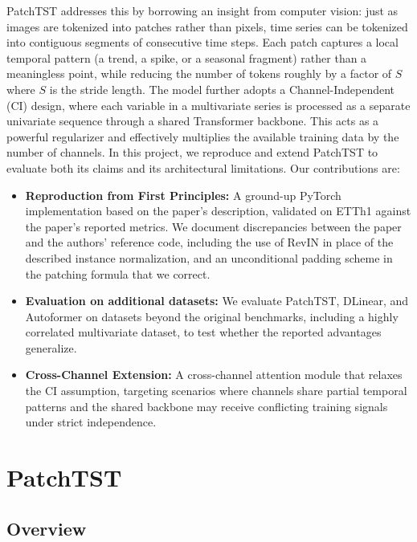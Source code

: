 \documentclass[11pt]{article}
\begin{document}
PatchTST addresses this by borrowing an insight from computer vision: just as images are tokenized into patches rather than pixels, time series can be tokenized into contiguous segments of consecutive time steps. Each patch captures a local temporal pattern (a trend, a spike, or a seasonal fragment) rather than a meaningless point, while reducing the number of tokens roughly by a factor of $S$ where $S$ is the stride length. The model further adopts a Channel-Independent (CI) design, where each variable in a multivariate series is processed as a separate univariate sequence through a shared Transformer backbone. This acts as a powerful regularizer and effectively multiplies the available training data by the number of channels.
In this project, we reproduce and extend PatchTST to evaluate both its claims and its architectural limitations. Our contributions are:
\begin{itemize}
\item \textbf{Reproduction from First Principles:} A ground-up PyTorch implementation based on the paper's description, validated on ETTh1 against the paper's reported metrics. We document discrepancies between the paper and the authors' reference code, including the use of RevIN in place of the described instance normalization, and an unconditional padding scheme in the patching formula that we correct.
\item \textbf{Evaluation on additional datasets:} We evaluate PatchTST, DLinear, and Autoformer on datasets beyond the original benchmarks, including a highly correlated multivariate dataset, to test whether the reported advantages generalize.
\item \textbf{Cross-Channel Extension:} A cross-channel attention module that relaxes the CI assumption, targeting scenarios where channels share partial temporal patterns and the shared backbone may receive conflicting training signals under strict independence.

\end{itemize}

\section{PatchTST}

\subsection{Overview}
\end{document}

